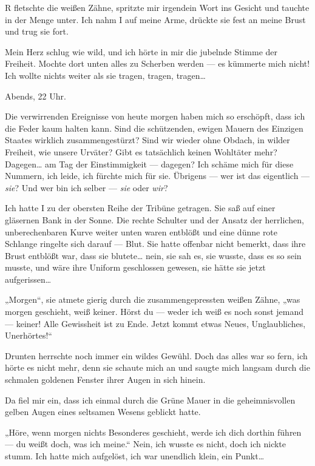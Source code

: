 R fletschte die weißen Zähne, spritzte mir irgendein Wort ins
Gesicht und tauchte in der Menge unter. Ich nahm I auf meine Arme,
drückte sie fest an meine Brust und trug sie fort.

Mein Herz schlug wie wild, und ich hörte in mir die jubelnde Stimme
der Freiheit. Mochte dort unten alles zu Scherben werden — es
kümmerte mich nicht! Ich wollte nichts weiter als sie tragen,
tragen, tragen\ldots{}

\bigpar
Abends, 22 Uhr.

Die verwirrenden Ereignisse von heute morgen haben mich so
erschöpft, dass ich die Feder kaum halten kann. Sind die
schützenden, ewigen Mauern des Einzigen Staates wirklich
zusammengestürzt? Sind wir wieder ohne Obdach, in wilder Freiheit,
wie unsere Urväter? Gibt es tatsächlich keinen Wohltäter mehr?
Dagegen\ldots{} am Tag der Einstimmigkeit — dagegen? Ich schäme mich für
diese Nummern, ich leide, ich fürchte mich für sie. Übrigens — wer
ist das eigentlich — \emph{sie}? Und wer bin ich selber — \emph{sie} oder \emph{wir}?

Ich hatte I zu der obersten Reihe der Tribüne getragen. Sie saß auf
einer gläsernen Bank in der Sonne. Die rechte Schulter und der
Ansatz der herrlichen, unberechenbaren Kurve weiter unten waren
entblößt und eine dünne rote Schlange ringelte sich darauf — Blut.
Sie hatte offenbar nicht bemerkt, dass ihre Brust entblößt war,
dass sie blutete\ldots{} nein, sie sah es, sie wusste, dass es so sein
musste, und wäre ihre Uniform geschlossen gewesen, sie hätte sie
jetzt aufgerissen\ldots{}

„Morgen“, sie atmete gierig durch die zusammengepressten weißen
Zähne, „was morgen geschieht, weiß keiner. Hörst du — weder ich
weiß es noch sonst jemand — keiner! Alle Gewissheit ist zu Ende.
Jetzt kommt etwas Neues, Unglaubliches, Unerhörtes!“

Drunten herrschte noch immer ein wildes Gewühl. Doch das alles war
so fern, ich hörte es nicht mehr, denn sie schaute mich an und
saugte mich langsam durch die schmalen goldenen Fenster ihrer Augen
in sich hinein.

Da fiel mir ein, dass ich einmal durch die Grüne
Mauer in die geheimnisvollen gelben Augen eines seltsamen Wesens
geblickt hatte.

„Höre, wenn morgen nichts Besonderes geschieht, werde ich dich
dorthin führen — du weißt doch, was ich meine.“ Nein, ich wusste es
nicht, doch ich nickte stumm. Ich hatte mich aufgelöst, ich war
unendlich klein, ein Punkt\ldots{}

